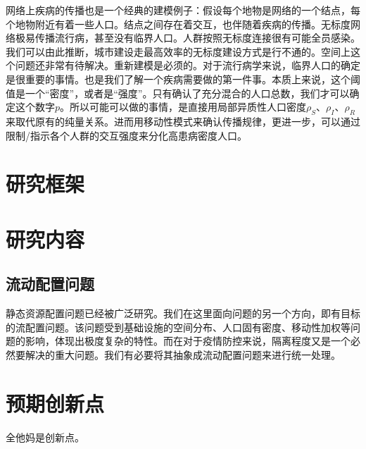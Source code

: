 网络上疾病的传播也是一个经典的建模例子：假设每个地物是网络的一个结点，每个地物附近有着一些人口。结点之间存在着交互，也伴随着疾病的传播。无标度网络极易传播流行病，甚至没有临界人口。人群按照无标度连接很有可能全员感染。我们可以由此推断，城市建设走最高效率的无标度建设方式是行不通的。空间上这个问题还非常有待解决。重新建模是必须的。对于流行病学来说，临界人口的确定是很重要的事情。也是我们了解一个疾病需要做的第一件事。本质上来说，这个阈值是一个“密度”，或者是“强度”。只有确认了充分混合的人口总数，我们才可以确定这个数字$p$。所以可能可以做的事情，是直接用局部异质性人口密度$\rho_S$、$\rho_I$、$\rho_R$来取代原有的纯量关系。进而用移动性模式来确认传播规律，更进一步，可以通过限制/指示各个人群的交互强度来分化高患病密度人口。



\section{研究框架}



\section{研究内容}

\subsection{流动配置问题}

静态资源配置问题已经被广泛研究。我们在这里面向问题的另一个方向，即有目标的流配置问题。该问题受到基础设施的空间分布、人口固有密度、移动性加权等问题的影响，体现出极度复杂的特性。而在对于疫情防控来说，隔离程度又是一个必然要解决的重大问题。我们有必要将其抽象成流动配置问题来进行统一处理。

\section{预期创新点}
全他妈是创新点。